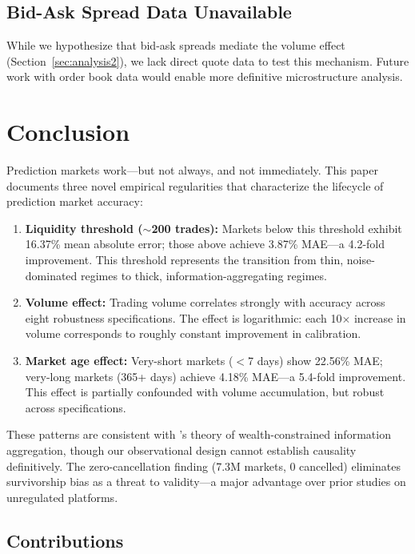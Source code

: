 \documentclass[12pt,letterpaper]{article}
\begin{document}
\subsection{Bid-Ask Spread Data Unavailable}

While we hypothesize that bid-ask spreads mediate the volume effect (Section~\ref{sec:analysis2}), we lack direct quote data to test this mechanism. Future work with order book data would enable more definitive microstructure analysis.

\clearpage
\section{Conclusion}\label{sec:conclusion}

Prediction markets work---but not always, and not immediately. This paper documents three novel empirical regularities that characterize the lifecycle of prediction market accuracy:

\begin{enumerate}
    \item \textbf{Liquidity threshold ($\sim$200 trades):} Markets below this threshold exhibit 16.37\% mean absolute error; those above achieve 3.87\% MAE---a 4.2-fold improvement. This threshold represents the transition from thin, noise-dominated regimes to thick, information-aggregating regimes.
    
    \item \textbf{Volume effect:} Trading volume correlates strongly with accuracy across eight robustness specifications. The effect is logarithmic: each 10$\times$ increase in volume corresponds to roughly constant improvement in calibration.
    
    \item \textbf{Market age effect:} Very-short markets ($<$7 days) show 22.56\% MAE; very-long markets (365+ days) achieve 4.18\% MAE---a 5.4-fold improvement. This effect is partially confounded with volume accumulation, but robust across specifications.
\end{enumerate}

These patterns are consistent with \citet{ottaviani2007outcomes}'s theory of wealth-constrained information aggregation, though our observational design cannot establish causality definitively. The zero-cancellation finding (7.3M markets, 0 cancelled) eliminates survivorship bias as a threat to validity---a major advantage over prior studies on unregulated platforms.

\subsection{Contributions}
\end{document}
